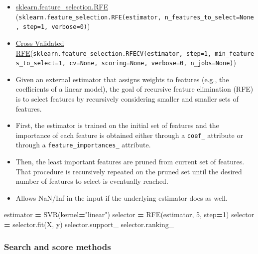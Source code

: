 \documentclass[]{article}
\newenvironment{Shaded}{\begin{snugshade}}{\end{snugshade}}
\newcommand{\DecValTok}[1]{\textcolor[rgb]{0.00,0.00,0.81}{#1}}
\newcommand{\NormalTok}[1]{#1}
\newcommand{\OperatorTok}[1]{\textcolor[rgb]{0.81,0.36,0.00}{\textbf{#1}}}
\newcommand{\StringTok}[1]{\textcolor[rgb]{0.31,0.60,0.02}{#1}}
\providecommand{\tightlist}{%
  \setlength{\itemsep}{0pt}\setlength{\parskip}{0pt}}
\begin{document}
\begin{itemize}
\tightlist
\item
  \href{https://scikit-learn.org/stable/modules/generated/sklearn.feature_selection.RFE.html\#sklearn.feature_selection.RFE}{sklearn.feature\_selection.RFE}
  (\texttt{sklearn.feature\_selection.RFE(estimator,\ n\_features\_to\_select=None,\ step=1,\ verbose=0)})
\item
  \href{https://scikit-learn.org/stable/modules/generated/sklearn.feature_selection.RFECV.html\#sklearn.feature_selection.RFECV}{Cross
  Validated
  RFE}(\texttt{sklearn.feature\_selection.RFECV(estimator,\ step=1,\ min\_features\_to\_select=1,\ cv=None,\ scoring=None,\ verbose=0,\ n\_jobs=None)})\\
\item
  Given an external estimator that assigns weights to features (e.g.,
  the coefficients of a linear model), the goal of recursive feature
  elimination (RFE) is to select features by recursively considering
  smaller and smaller sets of features.\\
\item
  First, the estimator is trained on the initial set of features and the
  importance of each feature is obtained either through a
  \texttt{coef\_} attribute or through a \texttt{feature\_importances\_}
  attribute.\\
\item
  Then, the least important features are pruned from current set of
  features. That procedure is recursively repeated on the pruned set
  until the desired number of features to select is eventually
  reached.\\
\item
  Allows NaN/Inf in the input if the underlying estimator does as well.
\end{itemize}

\begin{Shaded}
\begin{Highlighting}[]
\NormalTok{estimator }\OperatorTok{=}\NormalTok{ SVR(kernel}\OperatorTok{=}\StringTok{"linear"}\NormalTok{)}
\NormalTok{selector }\OperatorTok{=}\NormalTok{ RFE(estimator, }\DecValTok{5}\NormalTok{, step}\OperatorTok{=}\DecValTok{1}\NormalTok{)}
\NormalTok{selector }\OperatorTok{=}\NormalTok{ selector.fit(X, y)}
\NormalTok{selector.support_}
\NormalTok{selector.ranking_}
\end{Highlighting}
\end{Shaded}

\hypertarget{search-and-score-methods}{%
\subsubsection{Search and score
methods}\label{search-and-score-methods}}
\end{document}
